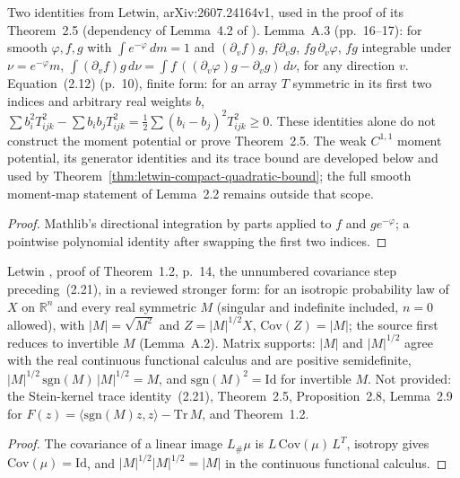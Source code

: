 \begin{lemma}
  \label{lem:letwin-support-identities}
  \leanok
  Two identities from Letwin, arXiv:2607.24164v1, used in the proof of its Theorem~2.5
  (dependency of Lemma~4.2 of \cite{BizeulKlartagLehec2026}). Lemma~A.3 (pp.~16--17): for smooth
  $\varphi,f,g$ with $\int e^{-\varphi}\,dm=1$ and $(\partial_vf)g$, $f\partial_vg$,
  $fg\,\partial_v\varphi$, $fg$ integrable under $\nu=e^{-\varphi}m$,
  $\int(\partial_vf)g\,d\nu=\int f\,((\partial_v\varphi)g-\partial_vg)\,d\nu$, for any direction $v$.
  Equation~(2.12) (p.~10), finite form: for an array $T$ symmetric in its first two indices and
  arbitrary real weights $b$,
  $\sum b_i^2T_{ijk}^2-\sum b_ib_jT_{ijk}^2=\tfrac12\sum(b_i-b_j)^2T_{ijk}^2\ge0$.
  These identities alone do not construct the moment potential or prove Theorem~2.5. The weak $C^{1,1}$ moment potential, its generator identities and its trace bound are developed below and used by Theorem~\ref{thm:letwin-compact-quadratic-bound}; the full smooth moment-map statement of Lemma~2.2 remains outside that scope.
\end{lemma}
\begin{proof}
  \leanok
  Mathlib's directional integration by parts applied to $f$ and $g e^{-\varphi}$; a pointwise
  polynomial identity after swapping the first two indices.
\end{proof}

\begin{lemma}
  \label{lem:letwin-mapped-covariance}
  \leanok
  Letwin \cite{Letwin2026QuadraticKLS}, proof of Theorem~1.2, p.~14, the unnumbered covariance step preceding~(2.21), in
  a reviewed stronger form: for an isotropic probability law of $X$ on $\mathbb R^n$ and every real symmetric $M$
  (singular and indefinite included, $n=0$ allowed), with $|M|=\sqrt{M^2}$ and $Z=|M|^{1/2}X$, $\mathrm{Cov}(Z)=|M|$; the
  source first reduces to invertible $M$ (Lemma~A.2).  Matrix supports: $|M|$ and $|M|^{1/2}$ agree with the real
  continuous functional calculus and are positive semidefinite, $|M|^{1/2}\,\mathrm{sgn}(M)\,|M|^{1/2}=M$, and
  $\mathrm{sgn}(M)^2=\mathrm{Id}$ for invertible $M$.  Not provided: the Stein-kernel trace identity~(2.21), Theorem~2.5,
  Proposition~2.8, Lemma~2.9 for $F(z)=\langle\mathrm{sgn}(M)z,z\rangle-\mathrm{Tr}\,M$, and Theorem~1.2.
\end{lemma}
\begin{proof}
  \leanok
  The covariance of a linear image $L_\#\mu$ is $L\,\mathrm{Cov}(\mu)\,L^{T}$, isotropy gives $\mathrm{Cov}(\mu)=\mathrm{Id}$,
  and $|M|^{1/2}|M|^{1/2}=|M|$ in the continuous functional calculus.
\end{proof}

